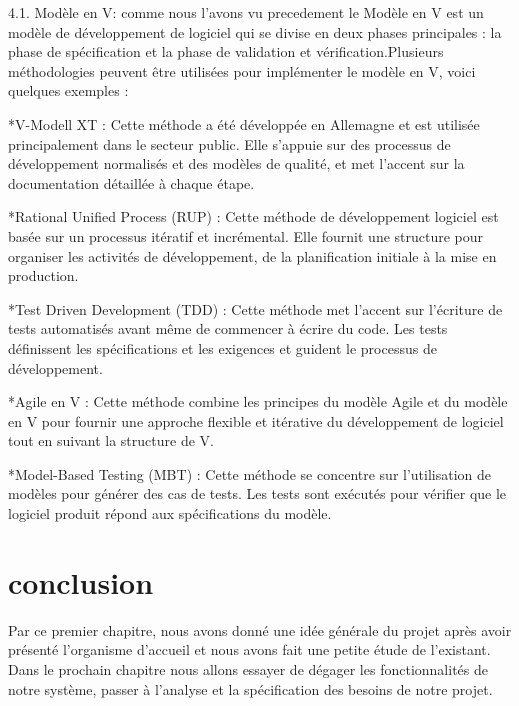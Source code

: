 \documentclass{report}
\begin{document}
4.1. Modèle en V:
comme nous l'avons vu precedement le Modèle en V est un modèle de développement de logiciel qui se divise en deux phases principales : la phase de spécification et la phase de validation et vérification.Plusieurs méthodologies peuvent être utilisées pour implémenter le modèle en V, voici quelques exemples :

*V-Modell XT : Cette méthode a été développée en Allemagne et est utilisée principalement dans le secteur public. Elle s'appuie sur des processus de développement normalisés et des modèles de qualité, et met l'accent sur la documentation détaillée à chaque étape.

*Rational Unified Process (RUP) : Cette méthode de développement logiciel est basée sur un processus itératif et incrémental. Elle fournit une structure pour organiser les activités de développement, de la planification initiale à la mise en production.

*Test Driven Development (TDD) : Cette méthode met l'accent sur l'écriture de tests automatisés avant même de commencer à écrire du code. Les tests définissent les spécifications et les exigences et guident le processus de développement.

*Agile en V : Cette méthode combine les principes du modèle Agile et du modèle en V pour fournir une approche flexible et itérative du développement de logiciel tout en suivant la structure de V.

*Model-Based Testing (MBT) : Cette méthode se concentre sur l'utilisation de modèles pour générer des cas de tests. Les tests sont exécutés pour vérifier que le logiciel produit répond aux spécifications du modèle.
\section{conclusion}
Par ce premier chapitre, nous avons donné une idée générale du projet après avoir présenté 
l’organisme d’accueil et nous avons fait une petite étude de l’existant. Dans le prochain chapitre 
nous allons essayer de dégager les fonctionnalités de notre système, passer à l’analyse et la 
spécification des besoins de notre projet.
\end{document}
